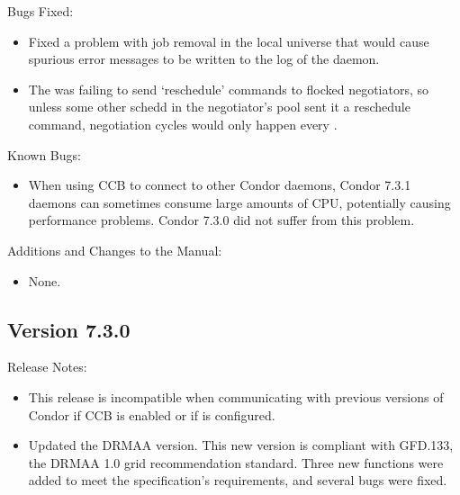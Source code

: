 \noindent Bugs Fixed:

\begin{itemize}

\item Fixed a problem with job removal in the local universe that 
  would cause spurious error messages to be written to the log of the
   daemon.

\item The  was failing to send `reschedule' commands to
flocked negotiators, so unless some other schedd in the negotiator's
pool sent it a reschedule command, negotiation cycles would only
happen every .

\end{itemize}

\noindent Known Bugs:

\begin{itemize}

\item When using CCB to connect to other Condor daemons, Condor 7.3.1
daemons can sometimes consume large amounts of CPU, potentially
causing performance problems.  Condor 7.3.0 did not suffer from this
problem.

\end{itemize}

\noindent Additions and Changes to the Manual:

\begin{itemize}

\item None.

\end{itemize}

\subsection*{\label{sec:New-7-3-0}Version 7.3.0}

\noindent Release Notes:

\begin{itemize}

\item This release is incompatible when communicating with
previous versions of Condor if CCB is enabled or if
 is configured.

\item Updated the DRMAA version.
This new version is compliant with GFD.133,
the DRMAA 1.0 grid recommendation standard.
Three new functions were added to meet the specification's requirements,
and several bugs were fixed.

\end{itemize}


